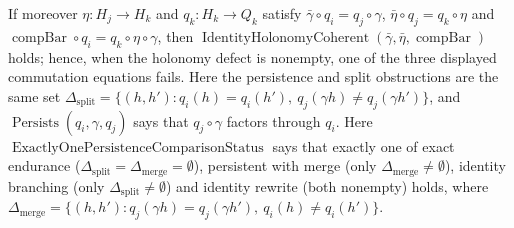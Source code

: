 \begin{theorem}
If moreover \(\eta:H_j\to H_k\) and \(q_k:H_k\to Q_k\) satisfy
\(\bar\gamma\circ q_i=q_j\circ\gamma\), \(\bar\eta\circ q_j=q_k\circ\eta\) and
\(\operatorname{compBar}\circ q_i=q_k\circ\eta\circ\gamma\), then
\(\operatorname{IdentityHolonomyCoherent}(\bar\gamma,\bar\eta,\operatorname{compBar})\)
holds; hence, when the holonomy defect is nonempty, one of the three
displayed commutation equations fails.
Here the persistence and split obstructions are the same set
\(\Delta_{\mathrm{split}}=\{(h,h'):q_i(h)=q_i(h'),\ q_j(\gamma h)\ne q_j(\gamma h')\}\), and
\(\operatorname{Persists}(q_i,\gamma,q_j)\) says that \(q_j\circ\gamma\)
factors through \(q_i\).
Here \(\operatorname{ExactlyOnePersistenceComparisonStatus}\) says that exactly
one of exact endurance (\(\Delta_{\mathrm{split}}=\Delta_{\mathrm{merge}}=\emptyset\)),
persistent with merge (only \(\Delta_{\mathrm{merge}}\ne\emptyset\)), identity
branching (only \(\Delta_{\mathrm{split}}\ne\emptyset\)) and identity rewrite (both
nonempty) holds, where \(\Delta_{\mathrm{merge}}=\{(h,h'):q_j(\gamma h)=q_j(\gamma
h'),\ q_i(h)\ne q_i(h')\}\).
\end{theorem}
